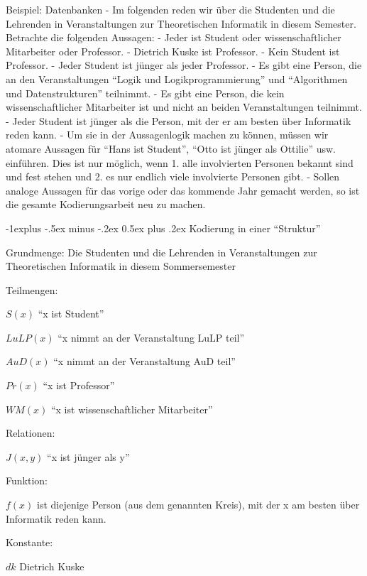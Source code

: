 \documentclass[a4paper]{article}
\makeatletter
\renewcommand{\subsection}{\@startsection{subsection}{2}{0mm}%
                {-1explus -.5ex minus -.2ex}%
                {0.5ex plus .2ex}%
                {\normalfont\normalsize\bfseries}}
\makeatother
\begin{document}
\begin{multicols}{3}
  Beispiel: Datenbanken - Im folgenden reden wir über die Studenten und
  die Lehrenden in Veranstaltungen zur Theoretischen Informatik in diesem
  Semester. Betrachte die folgenden Aussagen: - Jeder ist Student oder
  wissenschaftlicher Mitarbeiter oder Professor. - Dietrich Kuske ist
  Professor. - Kein Student ist Professor. - Jeder Student ist jünger als
  jeder Professor. - Es gibt eine Person, die an den Veranstaltungen
  ``Logik und Logikprogrammierung'' und ``Algorithmen und
  Datenstrukturen'' teilnimmt. - Es gibt eine Person, die kein
  wissenschaftlicher Mitarbeiter ist und nicht an beiden Veranstaltungen
  teilnimmt. - Jeder Student ist jünger als die Person, mit der er am
  besten über Informatik reden kann. - Um sie in der Aussagenlogik machen
  zu können, müssen wir atomare Aussagen für ``Hans ist Student'', ``Otto
  ist jünger als Ottilie'' usw. einführen. Dies ist nur möglich, wenn 1.
  alle involvierten Personen bekannt sind und fest stehen und 2. es nur
  endlich viele involvierte Personen gibt. - Sollen analoge Aussagen für
  das vorige oder das kommende Jahr gemacht werden, so ist die gesamte
  Kodierungsarbeit neu zu machen.

  \subsection{Kodierung in einer
    ``Struktur''}\label{kodierung-in-einer-struktur}

  \begin{itemize*}
    \itemsep1pt\parskip0pt
    \item
          Grundmenge: Die Studenten und die Lehrenden in Veranstaltungen zur
          Theoretischen Informatik in diesem Sommersemester
    \item
          Teilmengen:
    \item
          $S(x)$ ``x ist Student''
    \item
          $LuLP(x)$ ``x nimmt an der Veranstaltung LuLP teil''
    \item
          $AuD(x)$ ``x nimmt an der Veranstaltung AuD teil''
    \item
          $Pr(x)$ ``x ist Professor''
    \item
          $WM(x)$ ``x ist wissenschaftlicher Mitarbeiter''
    \item
          Relationen:
    \item
          $J(x,y)$ ``x ist jünger als y''
    \item
          Funktion:
    \item
          $f(x)$ ist diejenige Person (aus dem genannten Kreis), mit der x am
          besten über Informatik reden kann.
    \item
          Konstante:
    \item
          $dk$ Dietrich Kuske
  \end{itemize*}


\end{multicols}
\end{document}
